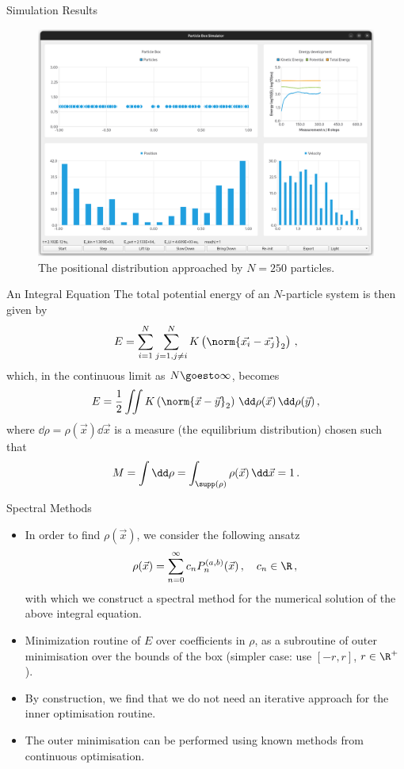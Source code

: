 \documentclass[aspectratio=169, hyperref={colorlinks=true}]{beamer}
\begin{document}
  \begin{frame}{Simulation Results}
    \begin{figure}
      \centering
      \includegraphics[width=0.64\linewidth]{figures/screenshot5.png}
      \caption*{The positional distribution approached by $N = 250$ particles.}
    \end{figure}
  \end{frame}

  \begin{frame}{An Integral Equation}
    \vspace{0.4cm}
    The total potential energy of an $N$-particle system is then given by
    $$E = \sum_{i=1}^{N} \sum_{j=1, j \neq i}^{N} K\left(\norm{\vec{x_i} - \vec{x_j}}_2\right)\,,$$
    which, in the continuous limit as $N \goesto \infty$, becomes
    $$E = \frac{1}{2} \iint K\left(\norm{\vec{x} - \vec{y}}_2\right) \,\dd\rho(\vec{x})\,\dd\rho(\vec{y})\,,$$
    where $\dd\rho = \rho(\vec{x})\dd\vec{x}$ is a measure (the equilibrium distribution) chosen such that
    $$M = \int \dd\rho = \int_{\supp(\rho)} \rho(\vec{x}) \,\dd\vec{x} = 1\,.$$
  \end{frame}

  \begin{frame}{Spectral Methods}
    \begin{itemize}
      \item In order to find $\rho(\vec{x})$, we consider the following ansatz
            $$\rho(\vec{x}) = \sum_{n=0}^{\infty} c_n P_n^{(a,b)}(\vec{x})\,,\quad c_n \in \R\,,$$
            with which we construct a spectral method for the numerical solution of the above integral equation.
      \item Minimization routine of $E$ over coefficients in $\rho$, as a subroutine of outer minimisation over the bounds of the box (simpler case: use $[-r, r]$, $r \in \R^+$).
      \item By construction, we find that we do not need an iterative approach for the inner optimisation routine.
      \item The outer minimisation can be performed using known methods from continuous optimisation.
    \end{itemize}
  \end{frame}
\end{document}
